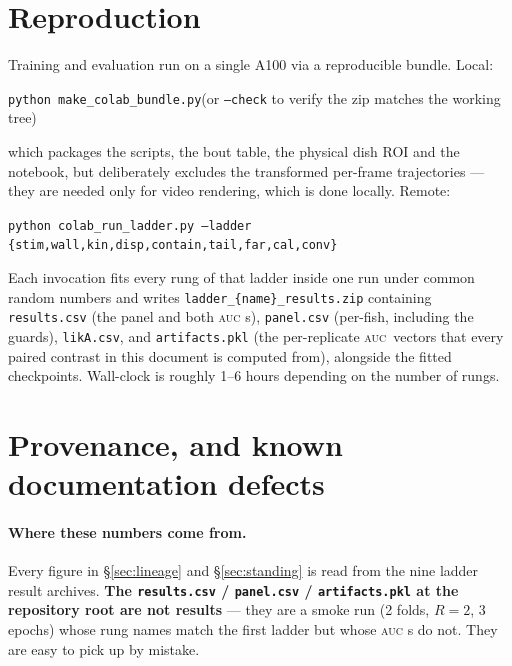 \documentclass[11pt,a4paper]{article}
\newcommand{\auc}{\textsc{auc}}
\newcommand{\code}[1]{\texttt{\small #1}}
\begin{document}
\section{Reproduction}

Training and evaluation run on a single A100 via a reproducible bundle. Local:
\begin{center}\code{python make\_colab\_bundle.py}\quad(or \code{--check} to verify the zip
matches the working tree)\end{center}
which packages the scripts, the bout table, the physical dish ROI and the notebook, but
deliberately excludes the transformed per-frame trajectories --- they are needed only for
video rendering, which is done locally. Remote:
\begin{center}\code{python colab\_run\_ladder.py --ladder \{stim,wall,kin,disp,contain,tail,far,cal,conv\}}\end{center}
Each invocation fits every rung of that ladder inside one run under common random numbers
and writes \code{ladder\_\{name\}\_results.zip} containing \code{results.csv} (the panel and
both \auc{} s), \code{panel.csv} (per-fish, including the guards), \code{likA.csv}, and
\code{artifacts.pkl} (the per-replicate \auc\ vectors that every paired contrast in this
document is computed from), alongside the fitted checkpoints. Wall-clock is roughly 1--6
hours depending on the number of rungs.

\section{Provenance, and known documentation defects}

\paragraph{Where these numbers come from.} Every figure in \S\ref{sec:lineage} and
\S\ref{sec:standing} is read from the nine ladder result archives. \textbf{The
\code{results.csv} / \code{panel.csv} / \code{artifacts.pkl} at the repository root are
not results} --- they are a smoke run (2 folds, $R=2$, 3 epochs) whose rung names match the
first ladder but whose \auc{} s do not. They are easy to pick up by mistake.
\end{document}

